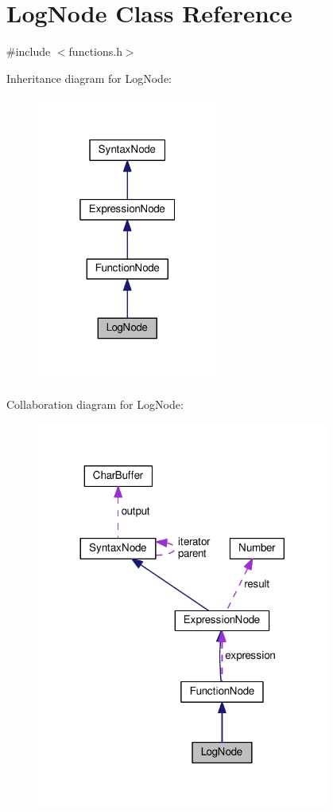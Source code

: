 \hypertarget{classLogNode}{}\section{Log\+Node Class Reference}
\label{classLogNode}


{\ttfamily \#include $<$functions.\+h$>$}



Inheritance diagram for Log\+Node\+:
\nopagebreak
\begin{figure}[H]
\begin{center}
\leavevmode
\includegraphics[width=169pt]{d3/d76/classLogNode__inherit__graph}
\end{center}
\end{figure}


Collaboration diagram for Log\+Node\+:
\nopagebreak
\begin{figure}[H]
\begin{center}
\leavevmode
\includegraphics[width=272pt]{d3/de8/classLogNode__coll__graph}
\end{center}
\end{figure}
